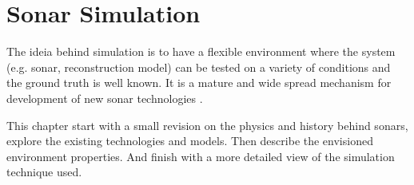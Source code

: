 \chapter{Sonar Simulation}

The ideia behind simulation is to have a flexible environment where the system
(e.g. sonar, reconstruction model) can be tested on a variety of conditions
and the ground truth is well known. It is a mature and wide spread
mechanism for development of new sonar technologies \cite{Etter2013}.

This chapter start with a small revision on the physics and history behind
sonars, explore the existing technologies and models. Then describe the
envisioned environment properties. And finish with a more detailed view of
the simulation technique used.




